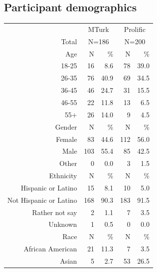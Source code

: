 \documentclass[a4paper,notitlepage,12pt]{article}
\begin{document}
\subsection*{Participant demographics}
\begin{table}[!h]
    \centering
    \small
    \setlength{\tabcolsep}{15pt}
    \begin{tabular}{ rrrrr }
        \toprule
        & \multicolumn{2}{c}{MTurk} & \multicolumn{2}{c}{Prolific} \\
        \cmidrule(lr){2-3} \cmidrule(lr){4-5}
        Total & \multicolumn{2}{c}{N=186} & \multicolumn{2}{c}{N=200} \\
        \midrule
        Age & N & \% & N & \% \\
        \cmidrule(lr){1-5}
        18-25   &      16 &   8.6 &       78 &  39.0 \\
        26-35   &      76 &  40.9 &       69 &  34.5 \\
        36-45   &      46 &  24.7 &       31 &  15.5 \\
        46-55   &      22 &  11.8 &       13 &   6.5 \\
        55+     &      26 &  14.0 &        9 &   4.5 \\
        \midrule
        Gender & N & \% & N & \% \\
        \cmidrule(lr){1-5}
        Female             &    83 &  44.6 &    112 &  56.0 \\
        Male               &   103 &  55.4 &     85 &  42.5 \\
        Other              &     0 &   0.0 &      3 &   1.5 \\
        \midrule
        Ethnicity & N & \% & N & \% \\
        \cmidrule(lr){1-5}
        Hispanic or Latino     &    15 &   8.1 &     10 &   5.0 \\
        Not Hispanic or Latino &   168 &  90.3 &    183 &  91.5 \\
        Rather not say         &     2 &   1.1 &      7 &   3.5 \\
        Unknown                &     1 &   0.5 &      0 &   0.0 \\
        \midrule
        Race & N & \% & N & \% \\
        \cmidrule(lr){1-5}
        African American                 &    21 &  11.3 &      7 &   3.5 \\
        Asian                                     &     5 &   2.7 &     53 &  26.5 \\

\end{tabular}
\end{table}
\end{document}
